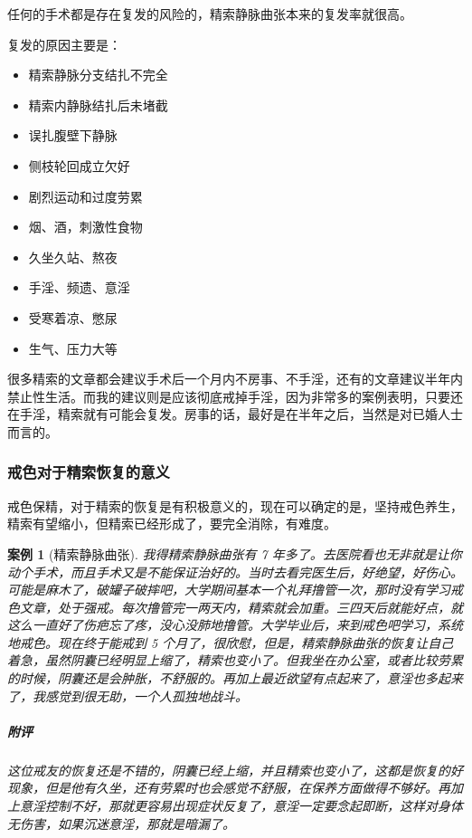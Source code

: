 \documentclass{ctexart}
\newtheorem{case}{案例}
\begin{document}
任何的手术都是存在复发的风险的，精索静脉曲张本来的复发率就很高。

复发的原因主要是：

\begin{multicols}{2}
    \begin{itemize}
        \item 精索静脉分支结扎不完全
        \item 精索内静脉结扎后未堵截
        \item 误扎腹壁下静脉
        \item 侧枝轮回成立欠好
        \item 剧烈运动和过度劳累
        \item 烟、酒，刺激性食物
        \item 久坐久站、熬夜
        \item 手淫、频遗、意淫
        \item 受寒着凉、憋尿
        \item 生气、压力大等
    \end{itemize}
\end{multicols}

很多精索的文章都会建议手术后一个月内不房事、不手淫，还有的文章建议半年内禁止性生活。而我的建议则是应该彻底戒掉手淫，因为非常多的案例表明，只要还在手淫，精索就有可能会复发。房事的话，最好是在半年之后，当然是对已婚人士而言的。

\subsubsection{戒色对于精索恢复的意义}

戒色保精，对于精索的恢复是有积极意义的，现在可以确定的是，坚持戒色养生，精索有望缩小，但精索已经形成了，要完全消除，有难度。

\begin{case}[精索静脉曲张]
    我得精索静脉曲张有 7 年多了。去医院看也无非就是让你动个手术，而且手术又是不能保证治好的。当时去看完医生后，好绝望，好伤心。可能是麻木了，破罐子破摔吧，大学期间基本一个礼拜撸管一次，那时没有学习戒色文章，处于强戒。每次撸管完一两天内，精索就会加重。三四天后就能好点，就这么一直好了伤疤忘了疼，没心没肺地撸管。大学毕业后，来到戒色吧学习，系统地戒色。现在终于能戒到 5 个月了，很欣慰，但是，精索静脉曲张的恢复让自己着急，虽然阴囊已经明显上缩了，精索也变小了。但我坐在办公室，或者比较劳累的时候，阴囊还是会肿胀，不舒服的。再加上最近欲望有点起来了，意淫也多起来了，我感觉到很无助，一个人孤独地战斗。
    \subparagraph{附评} 这位戒友的恢复还是不错的，阴囊已经上缩，并且精索也变小了，这都是恢复的好现象，但是他有久坐，还有劳累时也会感觉不舒服，在保养方面做得不够好。再加上意淫控制不好，那就更容易出现症状反复了，意淫一定要念起即断，这样对身体无伤害，如果沉迷意淫，那就是暗漏了。
\end{case}
\end{document}
